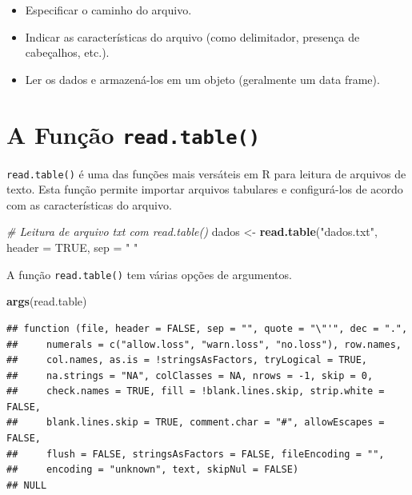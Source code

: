 \documentclass[
]{book}
\newenvironment{Shaded}{\begin{snugshade}}{\end{snugshade}}
\newcommand{\AttributeTok}[1]{\textcolor[rgb]{0.13,0.29,0.53}{#1}}
\newcommand{\CommentTok}[1]{\textcolor[rgb]{0.56,0.35,0.01}{\textit{#1}}}
\newcommand{\ConstantTok}[1]{\textcolor[rgb]{0.56,0.35,0.01}{#1}}
\newcommand{\FunctionTok}[1]{\textcolor[rgb]{0.13,0.29,0.53}{\textbf{#1}}}
\newcommand{\NormalTok}[1]{#1}
\newcommand{\OtherTok}[1]{\textcolor[rgb]{0.56,0.35,0.01}{#1}}
\newcommand{\StringTok}[1]{\textcolor[rgb]{0.31,0.60,0.02}{#1}}
\providecommand{\tightlist}{%
  \setlength{\itemsep}{0pt}\setlength{\parskip}{0pt}}
\begin{document}
\begin{itemize}
\tightlist
\item
  Especificar o caminho do arquivo.
\item
  Indicar as características do arquivo (como delimitador, presença de cabeçalhos, etc.).
\item
  Ler os dados e armazená-los em um objeto (geralmente um data frame).
\end{itemize}

\section{\texorpdfstring{A Função \texttt{read.table()}}{A Função read.table()}}\label{a-funuxe7uxe3o-read.table}

\texttt{read.table()} é uma das funções mais versáteis em R para leitura de arquivos de texto. Esta função permite importar arquivos tabulares e configurá-los de acordo com as características do arquivo.

\begin{Shaded}
\begin{Highlighting}[]
\CommentTok{\# Leitura de arquivo txt com read.table()}
\NormalTok{dados }\OtherTok{\textless{}{-}} \FunctionTok{read.table}\NormalTok{(}\StringTok{"dados.txt"}\NormalTok{, }\AttributeTok{header =} \ConstantTok{TRUE}\NormalTok{, }\AttributeTok{sep =} \StringTok{" "}
\end{Highlighting}
\end{Shaded}

A função \texttt{read.table()} tem várias opções de argumentos.

\begin{Shaded}
\begin{Highlighting}[]
\FunctionTok{args}\NormalTok{(read.table)}
\end{Highlighting}
\end{Shaded}

\begin{verbatim}
## function (file, header = FALSE, sep = "", quote = "\"'", dec = ".", 
##     numerals = c("allow.loss", "warn.loss", "no.loss"), row.names, 
##     col.names, as.is = !stringsAsFactors, tryLogical = TRUE, 
##     na.strings = "NA", colClasses = NA, nrows = -1, skip = 0, 
##     check.names = TRUE, fill = !blank.lines.skip, strip.white = FALSE, 
##     blank.lines.skip = TRUE, comment.char = "#", allowEscapes = FALSE, 
##     flush = FALSE, stringsAsFactors = FALSE, fileEncoding = "", 
##     encoding = "unknown", text, skipNul = FALSE) 
## NULL
\end{verbatim}
\end{document}
